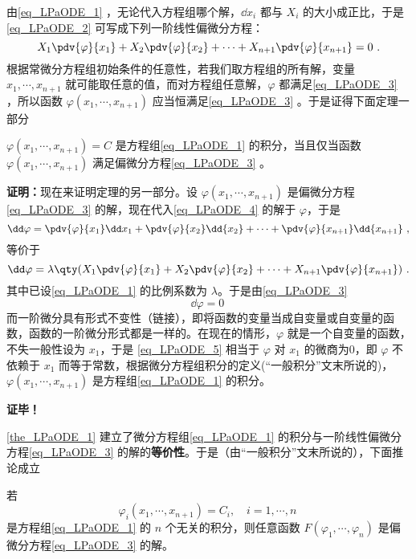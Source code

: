 由\autoref{eq_LPaODE_1} ，无论代入方程组哪个解，$\dd x_i$ 都与 $X_i$ 的大小成正比，于是\autoref{eq_LPaODE_2} 可写成下列一阶线性偏微分方程：
\begin{equation}\label{eq_LPaODE_3}
X_1\pdv{\varphi}{x_1}+X_2\pdv{\varphi}{x_2}+\cdots+X_{n+1}\pdv{\varphi}{x_{n+1}}=0~.
\end{equation}
根据常微分方程组初始条件的任意性，若我们取方程组的所有解，变量 $x_1,\cdots,x_{n+1}$ 就可能取任意的值，而对方程组任意解，$\varphi$ 都满足\autoref{eq_LPaODE_3} ，所以函数 $\varphi(x_1,\cdots,x_{n+1})$ 应当恒满足\autoref{eq_LPaODE_3} 。于是证得下面定理一部分
\begin{theorem}{}\label{the_LPaODE_1}
 $\varphi(x_1,\cdots,x_{n+1})=C$ 是方程组\autoref{eq_LPaODE_1} 的积分，当且仅当函数 $\varphi(x_1,\cdots,x_{n+1})$ 满足偏微分方程\autoref{eq_LPaODE_3} 。
\end{theorem}
 \textbf{证明：}现在来证明定理的另一部分。设 $\varphi(x_1,\cdots,x_{n+1})$ 是偏微分方程\autoref{eq_LPaODE_3} 的解，现在代入\autoref{eq_LPaODE_4} 的解于 $\varphi$，于是
 \begin{equation}
 \dd\varphi=\pdv{\varphi}{x_1}\dd x_1+\pdv{\varphi}{x_2}\dd{x_2}+\cdots+\pdv{\varphi}{x_{n+1}}\dd{x_{n+1}}~,
 \end{equation}
 等价于
 \begin{equation}
 \dd\varphi=\lambda\qty(X_1\pdv{\varphi}{x_1}+X_2\pdv{\varphi}{x_2}+\cdots+X_{n+1}\pdv{\varphi}{x_{n+1}})~.
 \end{equation}
 其中已设\autoref{eq_LPaODE_1} 的比例系数为 $\lambda$。于是由\autoref{eq_LPaODE_3} 
 \begin{equation}\label{eq_LPaODE_5}
 \dd\varphi=0~
 \end{equation}
 而一阶微分具有形式不变性（链接），即将函数的变量当成自变量或自变量的函数，函数的一阶微分形式都是一样的。在现在的情形，$\varphi$ 就是一个自变量的函数，不失一般性设为 $x_1$，于是 \autoref{eq_LPaODE_5} 相当于 $\varphi$ 对 $x_1$ 的微商为0，即 $\varphi$ 不依赖于 $x_1$ 而等于常数，根据微分方程组积分的定义(“一般积分”文末所说的)，$\varphi(x_1,\cdots,x_{n+1})$ 是方程组\autoref{eq_LPaODE_1} 的积分。

 \textbf{证毕！}

 \autoref{the_LPaODE_1} 建立了微分方程组\autoref{eq_LPaODE_1} 的积分与一阶线性偏微分方程\autoref{eq_LPaODE_3} 的解的\textbf{等价性}。于是（由“一般积分”文末所说的），下面推论成立
 \begin{corollary}{}\label{cor_LPaODE_1}
 若
 \begin{equation}
 \varphi_i(x_1,\cdots,x_{n+1})=C_i,\quad i=1,\cdots,n~
 \end{equation}
 是方程组\autoref{eq_LPaODE_1} 的 $n$ 个无关的积分，则任意函数 $F(\varphi_1,\cdots,\varphi_n)$ 是偏微分方程\autoref{eq_LPaODE_3} 的解。
 \end{corollary}
